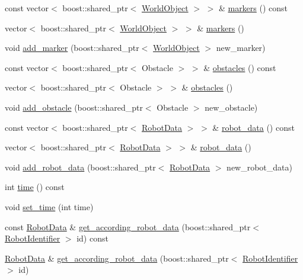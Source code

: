 \begin{CompactItemize}
\item 
const vector$<$ boost::shared\_\-ptr$<$ \hyperlink{class_world_object}{WorldObject} $>$ $>$ \& \hyperlink{class_world_information_de860e59ff258afc303720a171d1897e}{markers} () const 
\item 
vector$<$ boost::shared\_\-ptr$<$ \hyperlink{class_world_object}{WorldObject} $>$ $>$ \& \hyperlink{class_world_information_cff2c5c68d7c4dd999c462a0539eb2b2}{markers} ()
\item 
void \hyperlink{class_world_information_1da471aab9fcd304a6913b5b3568c66b}{add\_\-marker} (boost::shared\_\-ptr$<$ \hyperlink{class_world_object}{WorldObject} $>$ new\_\-marker)
\item 
const vector$<$ boost::shared\_\-ptr$<$ Obstacle $>$ $>$ \& \hyperlink{class_world_information_de0421ba8140ec32f9c6be1ced83658d}{obstacles} () const 
\item 
vector$<$ boost::shared\_\-ptr$<$ Obstacle $>$ $>$ \& \hyperlink{class_world_information_3493426dec99ed41f744a2778f8389c2}{obstacles} ()
\item 
void \hyperlink{class_world_information_315a7caced0da0ce9cb10d5db343c541}{add\_\-obstacle} (boost::shared\_\-ptr$<$ Obstacle $>$ new\_\-obstacle)
\item 
const vector$<$ boost::shared\_\-ptr$<$ \hyperlink{class_robot_data}{RobotData} $>$ $>$ \& \hyperlink{class_world_information_349f45bc117c0c25fb0d68dad8af1917}{robot\_\-data} () const 
\item 
vector$<$ boost::shared\_\-ptr$<$ \hyperlink{class_robot_data}{RobotData} $>$ $>$ \& \hyperlink{class_world_information_a4a03f11d75d6a9c036222c58733d1ab}{robot\_\-data} ()
\item 
void \hyperlink{class_world_information_1772ce91751ea42cb9ecdd23c697089a}{add\_\-robot\_\-data} (boost::shared\_\-ptr$<$ \hyperlink{class_robot_data}{RobotData} $>$ new\_\-robot\_\-data)
\item 
int \hyperlink{class_world_information_a20e784bfc5405883fa99313de3137ac}{time} () const 
\item 
void \hyperlink{class_world_information_1e733394b8c0c00d6c6f8ffca95a95e2}{set\_\-time} (int time)
\item 
const \hyperlink{class_robot_data}{RobotData} \& \hyperlink{class_world_information_4815e968feab5c7f034bf97cb96a40b8}{get\_\-according\_\-robot\_\-data} (boost::shared\_\-ptr$<$ \hyperlink{class_robot_identifier}{RobotIdentifier} $>$ id) const 
\item 
\hyperlink{class_robot_data}{RobotData} \& \hyperlink{class_world_information_6efbe4425124ac22c322bcdb3aa2c8a0}{get\_\-according\_\-robot\_\-data} (boost::shared\_\-ptr$<$ \hyperlink{class_robot_identifier}{RobotIdentifier} $>$ id)
\end{CompactItemize}
